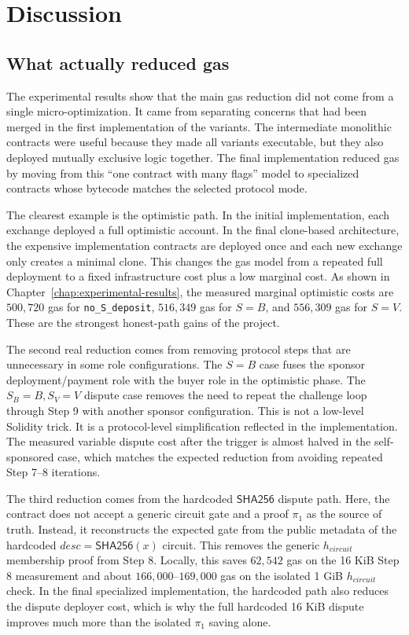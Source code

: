 \chapter{Discussion}
\label{chap:discussion}

\section{What actually reduced gas}

The experimental results show that the main gas reduction did not come from a single
micro-optimization. It came from separating concerns that had been merged in the first
implementation of the variants. The intermediate monolithic contracts were useful because they
made all variants executable, but they also deployed mutually exclusive logic together. The
final implementation reduced gas by moving from this ``one contract with many flags'' model
to specialized contracts whose bytecode matches the selected protocol mode.

The clearest example is the optimistic path. In the initial implementation, each exchange
deployed a full optimistic account. In the final clone-based architecture, the expensive
implementation contracts are deployed once and each new exchange only creates a minimal
clone. This changes the gas model from a repeated full deployment to a fixed infrastructure
cost plus a low marginal cost. As shown in Chapter~\ref{chap:experimental-results}, the
measured marginal optimistic costs are \(500,720\) gas for \texttt{no\_S\_deposit},
\(516,349\) gas for \(S=B\), and \(556,309\) gas for \(S=V\). These are the strongest
honest-path gains of the project.

The second real reduction comes from removing protocol steps that are unnecessary in some
role configurations. The \(S=B\) case fuses the sponsor deployment/payment role with the
buyer role in the optimistic phase. The \(S_B=B, S_V=V\) dispute case removes the need to
repeat the challenge loop through Step 9 with another sponsor configuration. This is not a
low-level Solidity trick. It is a protocol-level simplification reflected in the
implementation. The measured variable dispute cost after the trigger is almost halved in
the self-sponsored case, which matches the expected reduction from avoiding repeated
Step 7--8 iterations.

The third reduction comes from the hardcoded \(\mathsf{SHA256}\) dispute path. Here, the
contract does not accept a generic circuit gate and a proof \(\pi_1\) as the source of
truth. Instead, it reconstructs the expected gate from the public metadata of the
hardcoded \(desc=\mathsf{SHA256}(x)\) circuit. This removes the generic
\(h_{\mathit{circuit}}\) membership proof from Step 8. Locally, this saves \(62,542\) gas
on the 16 KiB Step 8 measurement and about \(166,000\)--\(169,000\) gas on the isolated
1 GiB \(h_{\mathit{circuit}}\) check. In the final specialized implementation, the
hardcoded path also reduces the dispute deployer cost, which is why the full hardcoded
16 KiB dispute improves much more than the isolated \(\pi_1\) saving alone.

